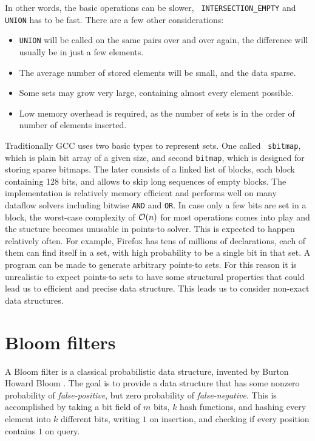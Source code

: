 In other words, the basic operations can be slower, {\tt
INTERSECTION\_EMPTY} and {\tt UNION} has to be fast. There are a few other considerations:

\begin{itemize}
	\item {\tt UNION} will be called on the same pairs over and over again,
		the difference will usually be in just a few elements.
	\item The average number of stored elements will be small, and the data sparse.
	\item Some sets may grow very large, containing almost every element possible.
	\item Low memory overhead is required, as the number of sets is in the order
		of number of elements inserted.
\end{itemize}


Traditionally GCC uses two basic types to represent sets. One called {\tt
sbitmap}, which is plain bit array of a given size, and second {\tt bitmap}, which
is designed for storing sparse bitmaps. The later consists of a linked list of blocks,
each block containing 128 bits, and allows to skip long sequences of empty
blocks. The implementation is relatively memory efficient and performs well on
many dataflow solvers including bitwise {\tt AND} and {\tt OR}. In case only
a few bits are set in a block, the worst-case complexity of $\mathcal{O}(n)$ for most
operations comes into play and the stucture becomes unusable in points-to
solver.  This is expected to happen relatively often. For example, Firefox has
tens of millions of declarations, each of them can find itself in a set, with
high probability to be a single bit in that set.  A program can be made to generate arbitrary points-to sets. For this reason it
is unrealistic to expect points-to sets to have some structural properties that
could lead us to efficient and precise data structure. This leads us to consider
non-exact data structures.

\section{Bloom filters}

A Bloom filter is a classical probabilistic data structure, invented by Burton
Howard Bloom \cite{Bloom1970}. The goal is to provide a data structure
that has some nonzero probability of {\it false-positive}, but zero probability
of {\it false-negative}. This is accomplished by taking a bit field of $m$ bits,
$k$ hash functions, and hashing every element into $k$ different bits, writing
$1$ on insertion, and checking if every position contains $1$ on query.


